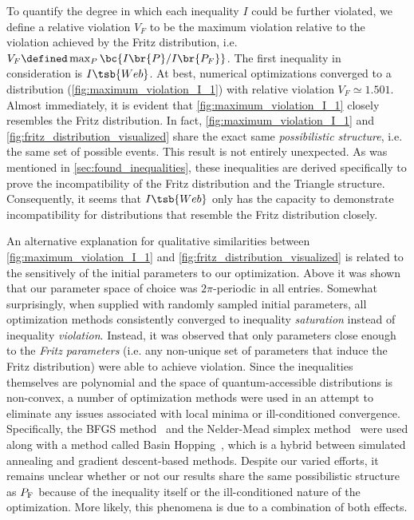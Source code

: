 \documentclass[aps, 10pt, english, twoside, pra, nofootinbib, tightenlines, longbibliography, superscriptaddress]{revtex4-1}
\begin{document}
    To quantify the degree in which each inequality $I$ could be further violated, we define a relative violation $V_F$ to be the maximum violation relative to the violation achieved by the Fritz distribution, i.e. $V_F \defined \max_{P}\bc{I\br{P}/I\br{P_F}}$. The first inequality in consideration is $I\tsb{Web}$. At best, numerical optimizations converged to a distribution (\cref{fig:maximum_violation_I_1}) with relative violation $V_F \simeq 1.501$. Almost immediately, it is evident that \cref{fig:maximum_violation_I_1} closely resembles the Fritz distribution. In fact, \cref{fig:maximum_violation_I_1} and \cref{fig:fritz_distribution_visualized} share the exact same \textit{possibilistic structure}, i.e. the same set of possible events. This result is not entirely unexpected. As was mentioned in \cref{sec:found_inequalities}, these inequalities are derived specifically to prove the incompatibility of the Fritz distribution and the Triangle structure. Consequently, it seems that $I\tsb{Web}$ only has the capacity to demonstrate incompatibility for distributions that resemble the Fritz distribution closely.

    An alternative explanation for qualitative similarities between \cref{fig:maximum_violation_I_1} and \cref{fig:fritz_distribution_visualized} is related to the sensitively of the initial parameters to our optimization. Above it was shown that our parameter space of choice was $2\pi$-periodic in all entries. Somewhat surprisingly, when supplied with randomly sampled initial parameters, all optimization methods consistently converged to inequality \textit{saturation} instead of inequality \textit{violation}. Instead, it was observed that only parameters close enough to the \textit{Fritz parameters} (i.e. any non-unique set of parameters that induce the Fritz distribution) were able to achieve violation. Since the inequalities themselves are polynomial and the space of quantum-accessible distributions is non-convex, a number of optimization methods were used in an attempt to eliminate any issues associated with local minima or ill-conditioned convergence. Specifically, the BFGS method~\cite[p.142]{Nocedal_2000} and the Nelder-Mead simplex method~\cite[p.238]{Nocedal_2000} were used along with a method called Basin Hopping~\cite{Wales_1997}, which is a hybrid between simulated annealing and gradient descent-based methods. Despite our varied efforts, it remains unclear whether or not our results share the same possibilistic structure as $\prob[\fritz]$ because of the inequality itself or the ill-conditioned nature of the optimization. More likely, this phenomena is due to a combination of both effects.
\end{document}
